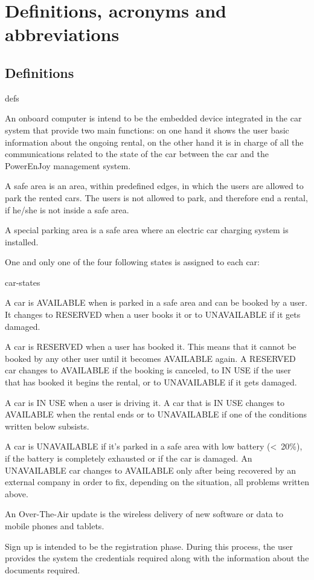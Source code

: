 \section{Definitions, acronyms and abbreviations}

\subsection{Definitions}
	\begin{labeling}{defs}
		\item[\textbf{Onboard computer}] An onboard computer is intend to be the embedded device integrated in the car system that provide two main functions: on one hand it shows the user basic information about the ongoing rental, on the other hand it is in charge of all the communications related to the state of the car between the car and the PowerEnJoy management system.
		\item[\textbf{Safe area}] A safe area is an area, within predefined edges, in which the users are allowed to park the rented cars. The users is not allowed to park, and therefore end a rental, if he/she is not inside a safe area.
		\item[\textbf{Special parking area}] A special parking area is a safe area where an electric car charging system is installed.
		\item[\textbf{Car states}] One and only one of the four following states is assigned to each car:
			\begin{labeling}{car-states}
				\item[\textbf{AVAILABLE}] A car is AVAILABLE when is parked in a safe area and can be booked by a user. It changes to RESERVED when a user books it or to UNAVAILABLE if it gets damaged.
				\item[\textbf{RESERVED}] A car is RESERVED when a user has booked it. This means that it cannot be booked by any other user until it becomes AVAILABLE again. A RESERVED car changes to AVAILABLE if the booking is canceled, to IN USE if the user that has booked it begins the rental, or to UNAVAILABLE if it gets damaged.
				\item[\textbf{IN USE}] A car is IN USE when a user is driving it. A car that is IN USE changes to AVAILABLE when the rental ends or to UNAVAILABLE if one of the conditions written below subsists.
				\item[\textbf{UNAVAILABLE}] A car is UNAVAILABLE if it's parked in a safe area with low battery (\textless\ 20\%), if the battery is completely exhausted or if the car is damaged. An UNAVAILABLE car changes to AVAILABLE only after being recovered by an external company in order to fix, depending on the situation, all problems written above.
			\end{labeling}
		\item[\textbf{Over-The-Air updates}] An Over-The-Air update is the wireless delivery of new software or data to mobile phones and tablets.
		\item[\textbf{Sign up}] Sign up is intended to be the registration phase. During this process, the user provides the system the credentials required along with the information about the documents required.
	\end{labeling}


